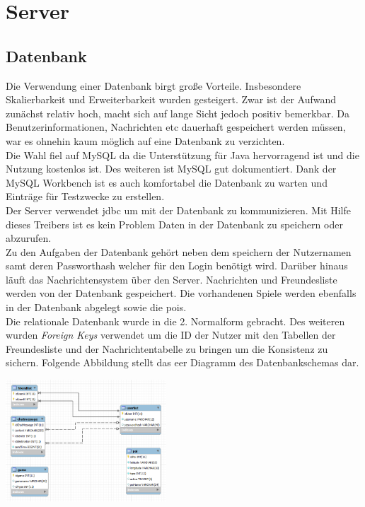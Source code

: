 \chapter{Server}
\section{Datenbank}

Die Verwendung einer Datenbank birgt große Vorteile. Insbesondere Skalierbarkeit und Erweiterbarkeit wurden gesteigert. Zwar ist der Aufwand zunächst relativ hoch, macht sich auf lange Sicht jedoch positiv bemerkbar. Da Benutzerinformationen, Nachrichten etc dauerhaft gespeichert werden müssen, war es ohnehin kaum möglich auf eine Datenbank zu verzichten.\\

Die Wahl fiel auf MySQL da die Unterstützung für Java hervorragend ist und die Nutzung kostenlos ist. Des weiteren ist MySQL gut dokumentiert. Dank der MySQL Workbench ist es auch komfortabel die Datenbank zu warten und Einträge für Testzwecke zu erstellen.\\

Der Server verwendet \gls{jdbc} um mit der Datenbank zu kommunizieren. Mit Hilfe dieses Treibers ist es kein Problem Daten in der Datenbank zu speichern oder abzurufen.\\

Zu den Aufgaben der Datenbank gehört neben dem speichern der Nutzernamen samt deren Passworthash welcher für den Login benötigt wird. Darüber hinaus 
läuft das Nachrichtensystem über den Server. Nachrichten und Freundesliste werden von der Datenbank gespeichert. Die vorhandenen Spiele werden ebenfalls in der Datenbank abgelegt sowie die \glspl{poi}.\\

Die relationale Datenbank wurde in die 2. Normalform gebracht. Des weiteren wurden \textit{Foreign Keys} verwendet um die ID der Nutzer mit den Tabellen der Freundesliste und der Nachrichtentabelle zu bringen um die Konsistenz zu sichern. Folgende Abbildung stellt das \gls{eer} Diagramm des Datenbankschemas dar.

\begin{capfigure}
	\includegraphics[width=6cm]{images/server/eer}
\end{capfigure}

